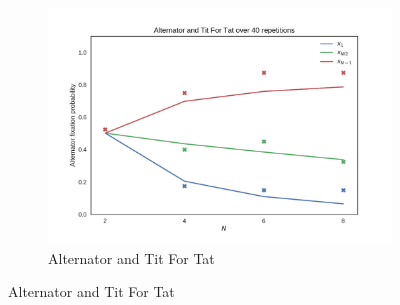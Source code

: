 \documentclass{article}
\begin{document}
\begin{figure}[!hbtp]
    ~
    \begin{subfigure}[t]{.3\textwidth}
        \centering
        \includegraphics[width=.8\textwidth]{../img/Alternator_v_Tit_For_Tat.pdf}
        \caption{Alternator and Tit For Tat}
    \end{subfigure}%


\end{figure}
\end{document}

